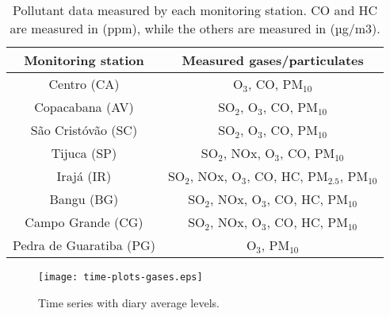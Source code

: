 \begin{table*}[t]
    \centering
    \begin{tabular}{|c|c|}
    \hline
    \textbf{Monitoring station}        & \textbf{Measured gases/particulates}              \\ \hline
    Centro (CA)             & O$_3$, CO, PM$_{10}$                              \\ \hline
    Copacabana (AV)         & SO$_2$, O$_3$, CO, PM$_{10}$                      \\ \hline
    São Cristóvão (SC)      & SO$_2$, O$_3$, CO, PM$_{10}$                      \\ \hline
    Tijuca (SP)             & SO$_2$, NOx, O$_3$, CO, PM$_{10}$                 \\ \hline
    Irajá (IR)              & SO$_2$, NOx, O$_3$, CO, HC, PM$_{2.5}$, PM$_{10}$ \\ \hline
    Bangu (BG)              & SO$_2$, NOx, O$_3$, CO, HC, PM$_{10}$             \\ \hline
    Campo Grande (CG)       & SO$_2$, NOx, O$_3$, CO, HC, PM$_{10}$             \\ \hline
    Pedra de Guaratiba (PG) & O$_3$, PM$_{10}$                                  \\ \hline
    \end{tabular}
    \caption{Pollutant data measured by each monitoring station. CO and HC are measured in (ppm), while the others are measured in (µg/m3).}
    \label{tab:pollutants-measured}
\end{table*}

\begin{figure*}[ht]
    \centering
    \texttt{[image: time-plots-gases.eps]}
    \caption{Time series with diary average levels.}
    \label{fig:time-series-gases}
\end{figure*}

